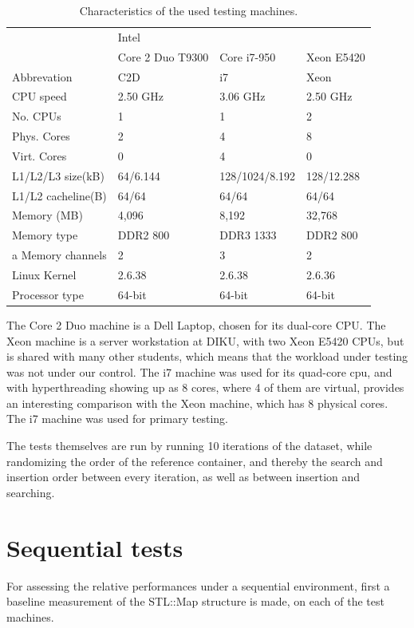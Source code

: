 \begin{table}[h!]
    \centering
    \begin{tabular}[here]{ l l l l }
        \hline
                  & Intel \\\cline{2-4}
                  & Core 2 Duo T9300 & Core i7-950  & Xeon E5420 \\ \hline
        Abbrevation & C2D & i7 & Xeon \\ 
        CPU speed   & 2.50 GHz & 3.06 GHz & 2.50 GHz \\
        No. CPUs    & 1 & 1 & 2 \\
        Phys. Cores & 2 & 4 & 8 \\
        Virt. Cores & 0 & 4 & 0 \\
        L1/L2/L3 size(kB) & 64/6.144 & 128/1024/8.192 & 128/12.288\\
        L1/L2 cacheline(B) & 64/64 & 64/64 & 64/64\\
        Memory (MB) & 4,096 & 8,192 & 32,768 \\
        Memory type & DDR2 800 & DDR3 1333 & DDR2 800 \\a
        Memory channels & 2 & 3 & 2 \\
        Linux Kernel    & 2.6.38 & 2.6.38 & 2.6.36 \\
        Processor type  & 64-bit & 64-bit & 64-bit \\\hline
    \end{tabular}
    \caption{Characteristics of the used testing machines.}
    \label{tab:cpucpecs}
\end{table}

The Core 2 Duo machine is a Dell Laptop, chosen for its dual-core CPU.
The Xeon machine is a server workstation at DIKU, with two Xeon E5420 CPUs,
but is shared with many other students, which means that the workload
under testing was not under our control. The i7 machine was used for its
quad-core cpu, and with hyperthreading showing up as 8 cores, where 4 of them
are virtual, provides an interesting comparison with the Xeon machine, which
has 8 physical cores. The i7 machine was used for primary testing.

The tests themselves are run by running 10 iterations of the dataset, while randomizing
the order of the reference container, and thereby the search and insertion order
between every iteration, as well as between insertion and searching.


\section{Sequential tests}
For assessing the relative performances under a sequential environment, first a
baseline measurement of the {\keyword STL::Map} structure is made, on each of
the test machines.

